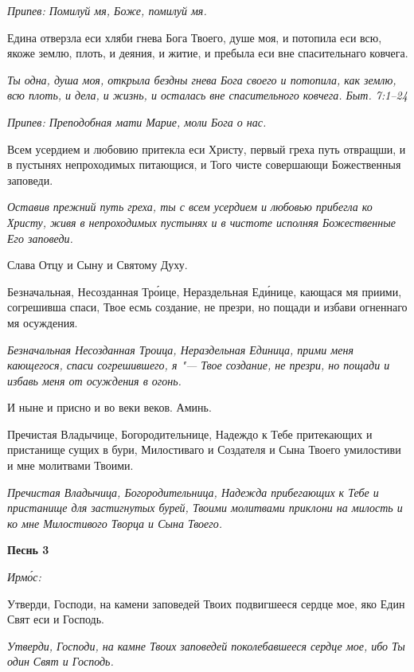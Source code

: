 \itshape Припев:\normalfont{} Помилуй мя, Боже, помилуй мя.


Едина отверзла еси хляби гнева Бога Твоего, душе моя, и потопила еси всю, якоже землю, плоть, и деяния, и житие, и пребыла еси вне спасительнаго ковчега.


\itshape Ты одна, душа моя, открыла бездны гнева Бога своего и потопила, как землю, всю плоть, и дела, и жизнь, и осталась вне спасительного ковчега. Быт. 7:1–24\normalfont{}


\itshape Припев:\normalfont{} Преподобная мати Марие, моли Бога о нас.


Всем усердием и любовию притекла еси Христу, первый греха путь отвращши, и в пустынях непроходимых питающися, и Того чисте совершающи Божественныя заповеди.


\itshape Оставив прежний путь греха, ты с всем усердием и любовью прибегла ко Христу, живя в непроходимых пустынях и в чистоте исполняя Божественные Его заповеди.\normalfont{}


Слава Отцу и Сыну и Святому Духу.


Безначальная, Несозданная Тро́ице, Нераздельная Еди́нице, кающася мя приими, согрешивша спаси, Твое есмь создание, не презри, но пощади и избави огненнаго мя осуждения.


\itshape Безначальная Несозданная Троица, Нераздельная Единица, прими меня кающегося, спаси согрешившего, я "--- Твое создание, не презри, но пощади и избавь меня от осуждения в огонь.\normalfont{}


И ныне и присно и во веки веков. Аминь.


Пречистая Владычице, Богородительнице, Надеждо к Тебе притекающих и пристанище сущих в бури, Милостиваго и Создателя и Сына Твоего умилостиви и мне молитвами Твоими.


\itshape Пречистая Владычица, Богородительница, Надежда прибегающих к Тебе и пристанище для застигнутых бурей, Твоими молитвами приклони на милость и ко мне Милостивого Творца и Сына Твоего.\normalfont{}





\bfseries Песнь 3\normalfont{}


\itshape Ирмо́с:\normalfont{}


Утверди, Господи, на камени заповедей Твоих подвигшееся сердце мое, яко Един Свят еси и Господь.


\itshape Утверди, Господи, на камне Твоих заповедей поколебавшееся сердце мое, ибо Ты один Свят и Господь.\normalfont{}


